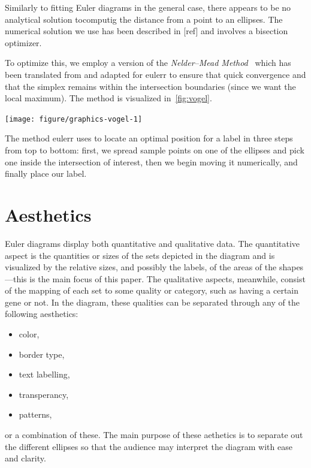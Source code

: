 \documentclass[
  oneside,
  usegeometry,
  numbers=noendperiod,
  openany,
  parskip=half
]{scrbook}\usepackage[]{graphicx}\usepackage{xcolor}
\newenvironment{knitrout}{}{} %
\newcommand{\pkg}[1]{{\fontseries{b}\selectfont #1}}
\begin{document}
\begin{appendices}
Similarly to fitting Euler diagrams in the general case, there appears to be no analytical solution tocomputig the distance from a point to an ellipses. The numerical solution we use has been described in [ref] and involves a bisection optimizer.

To optimize this, we employ a version of the \emph{Nelder--Mead Method}~\citep{nelder_1965} which has been translated from \citet{kelley_1999} and adapted for \pkg{eulerr} to ensure that quick convergence and that the simplex remains within the intersection boundaries (since we want the local maximum). The method is visualized in~\cref{fig:vogel}.
\begin{marginfigure}
\begin{knitrout}
\color{fgcolor}

{\centering \texttt{[image: figure/graphics-vogel-1]} 

}



\end{knitrout}
\caption{The method eulerr uses to locate an optimal position for a label in three steps from top to bottom: first, we spread sample points on one of the ellipses and pick one inside the intersection of interest, then we begin moving it numerically, and finally place our label.}
\label{fig:vogel}
\end{marginfigure}

\section{Aesthetics}
\label{sec:aesthetics}

Euler diagrams display both quantitative and qualitative data. The quantitative aspect is the quantities or sizes of the sets depicted in the diagram and is visualized by the relative sizes, and possibly the labels, of the areas of the shapes---this is the main focus of this paper. The qualitative aspects, meanwhile, consist of the mapping of each set to some quality or category, such as having a certain gene or not. In the diagram, these qualities can be separated through any of the following aesthetics:
%
\begin{itemize}
\item color,
\item border type,
\item text labelling,
\item transperancy,
\item patterns,
\end{itemize}
%
or a combination of these. The main purpose of these aethetics is to separate out the different ellipses so that the audience may interpret the diagram with ease and clarity.


\end{appendices}
\end{document}

